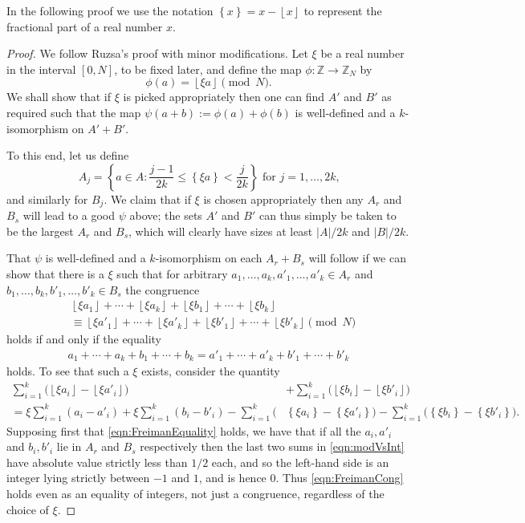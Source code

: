 \documentclass[12pt,a4paper,reqno]{amsart}
\numberwithin{equation}{section}
\theoremstyle{plain}
\theoremstyle{definition}
\renewcommand{\leq}{\leqslant}
\def\Z{\mathbb{Z}}
\newcommand{\Zmod}[1]{\Z_{#1}} %
\providecommand{\abs}[1]{\lvert#1\rvert}
\providecommand{\floor}[1]{\left\lfloor#1\right\rfloor}
\providecommand{\fracpart}[1]{\left\{#1\right\}}
\theoremstyle{plain}
\begin{document}
In the following proof we use the notation $\fracpart{x} = x - \floor{x}$ to represent the fractional part of a real number $x$.
\begin{proof}
We follow Ruzsa's proof with minor modifications. Let $\xi$ be a real number in the interval $[0,N]$, to be fixed later, and define the map $\phi : \Z \to \Zmod{N}$ by
\[ \phi(a) = \floor{ \xi a } \pmod{N}. \]
We shall show that if $\xi$ is picked appropriately then one can find $A'$ and $B'$ as required such that the map $\psi(a+b) := \phi(a) + \phi(b)$ is well-defined and a $k$-isomorphism on $A'+B'$.

To this end, let us define
\[ A_j = \left\{ a \in A : \frac{j-1}{2k} \leq \fracpart{\xi a} < \frac{j}{2k} \right\} \text{ for $j = 1,\ldots,2k$,} \]
and similarly for $B_j$. We claim that if $\xi$ is chosen appropriately then any $A_r$ and $B_s$ will lead to a good $\psi$ above; the sets $A'$ and $B'$ can thus simply be taken to be the largest $A_r$ and $B_s$, which will clearly have sizes at least $\abs{A}/2k$ and $\abs{B}/2k$.

That $\psi$ is well-defined and a $k$-isomorphism on each $A_r+B_s$ will follow if we can show that there is a $\xi$ such that for arbitrary $a_1, \ldots, a_k, a'_1,\dots,a'_k \in A_r$ and $b_1, \ldots, b_k,b'_1,\dots,b'_k \in B_s$ the congruence
\begin{equation}
\begin{split}
&\floor{\xi a_1} + \cdots + \floor{\xi a_k} +\floor{\xi b_1} + \cdots + \floor{\xi b_k} \\
&\equiv 
\floor{\xi a'_1} + \cdots + \floor{\xi a'_k} +\floor{\xi b'_1} + \cdots + \floor{\xi b'_k} \pmod{N} \label{eqn:FreimanCong}
\end{split}
\end{equation}
holds if and only if the equality
\begin{align}
a_1 + \cdots + a_k + b_1 + \cdots + b_k
=a'_1 + \cdots + a'_k + b'_1 + \cdots + b'_k
\label{eqn:FreimanEquality}
\end{align}
holds. To see that such a $\xi$ exists, consider the quantity
\begin{equation}
\begin{split}
\sum_{i=1}^k \big( \floor{\xi a_i} - \floor{\xi a'_i} \big) 
&+\sum_{i=1}^k \big( \floor{\xi b_i} - \floor{\xi b'_i} \big) \\
= \xi\sum_{i=1}^k (a_i - a'_i) + \xi\sum_{i=1}^k (b_i - b'_i) 
- \sum_{i=1}^k \big(& \fracpart{\xi a_i} - \fracpart{\xi a'_i} \big)
- \sum_{i=1}^k \big( \fracpart{\xi b_i} - \fracpart{\xi b'_i} \big).
\end{split}
\label{eqn:modVsInt}
\end{equation}
Supposing first that \eqref{eqn:FreimanEquality} holds, we have that if all the $a_i,a'_i$ and $b_i,b'_i$ lie in $A_r$ and $B_s$ respectively then the last two sums in \eqref{eqn:modVsInt} have absolute value strictly less than $1/2$ each, and so the left-hand side is an integer lying strictly between $-1$ and $1$, and is hence $0$. Thus \eqref{eqn:FreimanCong} holds even as an equality of integers, not just a congruence, regardless of the choice of $\xi$.


\end{proof}
\end{document}
